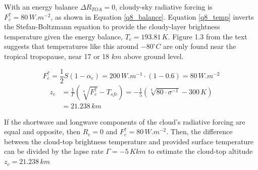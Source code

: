 \documentclass[12pt]{article}
\begin{document}
With an energy balance $\Delta R_{TOA} = 0$,  cloudy-sky radiative forcing is $F_c^\uparrow = 80\,\si{W.m^{-2}}$, as shown in Equation \ref{q8_balance}.
Equation \ref{q8_temp} inverts the Stefan-Boltzmann equation to provide the cloudy-layer brightness temperature given the energy balance, $T_c = 193.81\,\si{K}$.
Figure 1.3 from the text suggests that temperatures like this around $-80^\circ C$ are only found near the tropical tropopause, near 17 or 18 $\si{km}$ above ground level.

\begin{equation}
    F_c^\uparrow = \frac{1}{2} S(1-\alpha_c) = 200\,\si{W.m^{-1}}\cdot(1-0.6) = 80\,\si{W.m^{-2}}
\end{equation}
\begin{equation}
    \begin{split}
        z_c &= \frac{1}{\Gamma}\left(\sqrt[4]{F_c^\uparrow}-T_{sfc}\right) = -\frac{1}{5}\left(\sqrt[4]{80\cdot\sigma^{-1}}-300\,\si{K}\right) \\
        &= 21.238\,\si{km}
    \end{split}
\end{equation}


If the shortwave and longwave components of the cloud's radiative forcing are equal and opposite, then $R_c = 0$ and $F_c^\uparrow = 80\,\si{W.m^{-2}}$.
Then, the difference between the cloud-top brightness temperature and provided surface temperature can be divided by the lapse rate $\Gamma = -5\,\si{K}{km}$
to estimate the cloud-top altitude $z_c = 21.238\,\si{km}$
\end{document}
